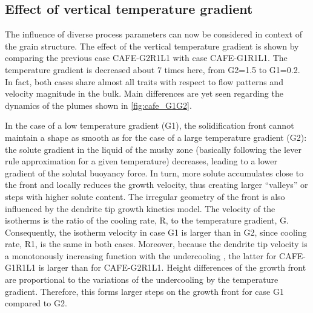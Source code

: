 \subsection{Effect of vertical temperature gradient}

The influence of diverse process parameters can now be considered in context of the grain structure. 
The effect of the vertical temperature gradient is shown by comparing the previous case CAFE-G2R1L1 
with case CAFE-G1R1L1. The temperature gradient is decreased about 7 times here, from G2=\SI{1.5}{\ugradT}
to G1=\SI{0.2}{\ugradT}. In fact, both cases share almost all traits with respect to flow patterns and velocity
magnitude in the bulk. Main differences are yet seen regarding the dynamics of the plumes shown in 
\cref{fig:cafe_G1G2}. 

In the case of a low temperature gradient (G1), the solidification front cannot maintain a 
shape as smooth as for the case of a large temperature gradient (G2): the solute gradient in the 
liquid of the mushy zone (basically following the lever rule approximation for a given temperature) 
decreases, leading to a lower gradient of the solutal buoyancy force. In turn, more solute accumulates 
close to the front and locally reduces the growth velocity, thus creating larger “valleys” or steps 
with higher solute content. The irregular geometry of the front is also influenced by the dendrite tip 
growth kinetics model. The velocity of the isotherms is the ratio of the cooling rate, R, to the 
temperature gradient, G. Consequently, the isotherm velocity in case G1 is larger than in G2, since 
cooling rate, R1, is the same in both cases. Moreover, because the dendrite tip velocity is a monotonously 
increasing function with the undercooling \citep{gandin_boundary_2003}, the latter for CAFE-G1R1L1 is larger 
than for CAFE-G2R1L1. Height differences of the growth front are proportional to the variations of the 
undercooling by the temperature gradient. Therefore, this forms larger steps on the growth front for case 
G1 compared to G2. 

